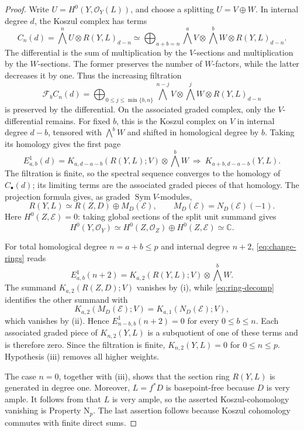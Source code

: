 \documentclass[11pt,reqno]{amsart}
\numberwithin{equation}{section}
\theoremstyle{remark}
\newcommand{\sshf}[1]{\mathcal{O}_{#1}}
\newcommand{\shf}[1]{\mathscr{#1}}
\newcommand{\iso}{\simeq}
\newcommand{\Sym}{\operatorname{Sym}}
\newcommand{\NP}{\mathrm N}
\begin{document}
\begin{proof}
Write \(U=H^0(Y,\sshf{Y}(L))\), and choose a splitting
\(U=V\oplus W\). In internal degree \(d\), the Koszul complex has terms
\[
 C_n(d)=\bigwedge^nU\otimes R(Y,L)_{d-n}
 \iso \bigoplus_{a+b=n}\bigwedge^aV\otimes\bigwedge^bW
       \otimes R(Y,L)_{d-n}.
\]
The differential is the sum of multiplication by the \(V\)-sections
and multiplication by the \(W\)-sections. The former preserves the
number of \(W\)-factors, while the latter decreases it by one. Thus
the increasing filtration
\[
 \mathcal F_bC_n(d)=
 \bigoplus_{0\leq j\leq\min\{b,n\}}\bigwedge^{n-j}V\otimes\bigwedge^jW
       \otimes R(Y,L)_{d-n}
\]
is preserved by the differential. On the associated graded complex,
only the \(V\)-differential remains. For fixed \(b\), this is the
Koszul complex on \(V\) in internal degree \(d-b\), tensored with
\(\bigwedge^bW\) and shifted in homological degree by \(b\).
Taking its homology gives the first page
\begin{equation}\label{eq:change-rings}
 E^1_{a,b}(d)=
 K_{a,d-a-b}(R(Y,L);V)\otimes\bigwedge^bW
 \ \Longrightarrow\
 K_{a+b,d-a-b}(Y,L).
\end{equation}
The filtration is finite, so the spectral sequence converges to the
homology of \(C_\bullet(d)\); its limiting terms are the associated
graded pieces of that homology. The projection formula gives, as graded
\(\Sym V\)-modules,
\begin{equation}\label{eq:ring-decomp}
 R(Y,L)\iso R(Z,D)\oplus M_D(\shf{E}),
 \qquad M_D(\shf{E})=N_D(\shf{E})(-1).
\end{equation}
Here \(H^0(Z,\shf{E})=0\): taking global sections of the split unit
summand gives
\[
 H^0(Y,\sshf{Y})\iso H^0(Z,\sshf{Z})\oplus H^0(Z,\shf{E})\iso \mathbb{C}.
\]

For total homological degree \(n=a+b\leq p\) and internal degree \(n+2\),
\eqref{eq:change-rings} reads
\[
 E^1_{a,b}(n+2)=
 K_{a,2}(R(Y,L);V)\otimes\bigwedge^bW.
\]
The summand \(K_{a,2}(R(Z,D);V)\) vanishes by \textup{(i)}, while
\eqref{eq:ring-decomp} identifies the other summand with
\[
 K_{a,2}(M_D(\shf{E});V)
 =K_{a,1}(N_D(\shf{E});V),
\]
which vanishes by (ii). Hence \(E^1_{n-b,b}(n+2)=0\) for every
\(0\leq b\leq n\). Each associated graded piece of
\(K_{n,2}(Y,L)\) is a subquotient of one of these terms and is
therefore zero. Since the filtration is finite, \(K_{n,2}(Y,L)=0\)
for \(0\leq n\leq p\). Hypothesis (iii) removes all higher weights.

The case \(n=0\), together with (iii), shows that the section ring $R(Y, L)$ is
generated in degree one. Moreover, \(L=f^*D\) is basepoint-free because
\(D\) is very ample. It follows from
\cite[pp.~38--39]{Mumford} that $L$ is very ample, so the asserted Koszul-cohomology vanishing is Property
\(\NP_p\). The last assertion follows because Koszul cohomology commutes with finite direct sums.
\end{proof}
\end{document}
